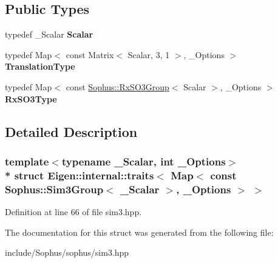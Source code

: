 \subsection*{Public Types}
\begin{DoxyCompactItemize}
\item 
typedef \+\_\+\+Scalar {\bfseries Scalar}\hypertarget{struct_eigen_1_1internal_1_1traits_3_01_map_3_01const_01_sophus_1_1_sim3_group_3_01___scalar_01_4_00_01___options_01_4_01_4_a16b31ac5dedde7a41bbaa8917ae901cd}{}\label{struct_eigen_1_1internal_1_1traits_3_01_map_3_01const_01_sophus_1_1_sim3_group_3_01___scalar_01_4_00_01___options_01_4_01_4_a16b31ac5dedde7a41bbaa8917ae901cd}

\item 
typedef Map$<$ const Matrix$<$ Scalar, 3, 1 $>$, \+\_\+\+Options $>$ {\bfseries Translation\+Type}\hypertarget{struct_eigen_1_1internal_1_1traits_3_01_map_3_01const_01_sophus_1_1_sim3_group_3_01___scalar_01_4_00_01___options_01_4_01_4_ad8e858a82f8c7f04dcf684d8c536b854}{}\label{struct_eigen_1_1internal_1_1traits_3_01_map_3_01const_01_sophus_1_1_sim3_group_3_01___scalar_01_4_00_01___options_01_4_01_4_ad8e858a82f8c7f04dcf684d8c536b854}

\item 
typedef Map$<$ const \hyperlink{class_sophus_1_1_rx_s_o3_group}{Sophus\+::\+Rx\+S\+O3\+Group}$<$ Scalar $>$, \+\_\+\+Options $>$ {\bfseries Rx\+S\+O3\+Type}\hypertarget{struct_eigen_1_1internal_1_1traits_3_01_map_3_01const_01_sophus_1_1_sim3_group_3_01___scalar_01_4_00_01___options_01_4_01_4_ae49d24c0c32a2912fc43df617eb199da}{}\label{struct_eigen_1_1internal_1_1traits_3_01_map_3_01const_01_sophus_1_1_sim3_group_3_01___scalar_01_4_00_01___options_01_4_01_4_ae49d24c0c32a2912fc43df617eb199da}

\end{DoxyCompactItemize}


\subsection{Detailed Description}
\subsubsection*{template$<$typename \+\_\+\+Scalar, int \+\_\+\+Options$>$\\*
struct Eigen\+::internal\+::traits$<$ Map$<$ const Sophus\+::\+Sim3\+Group$<$ \+\_\+\+Scalar $>$, \+\_\+\+Options $>$ $>$}



Definition at line 66 of file sim3.\+hpp.



The documentation for this struct was generated from the following file\+:\begin{DoxyCompactItemize}
\item 
include/\+Sophus/sophus/sim3.\+hpp\end{DoxyCompactItemize}
